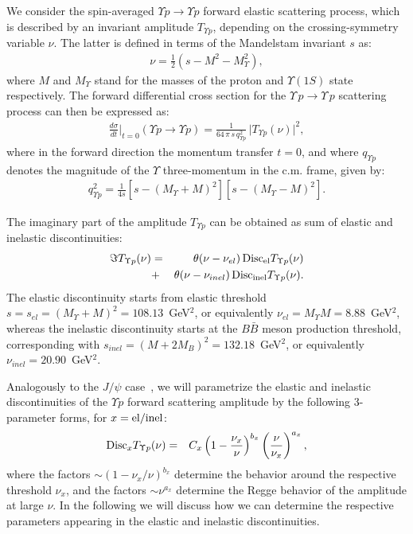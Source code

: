 \documentclass[prd,amsmath,%
twocolumn,floatfix,amssymb, preprintnumbers, linenumbers,nofootinbib, superscriptaddress]{revtex4}
\newcommand{\bea}{\begin{eqnarray}}
\newcommand{\eea}{\end{eqnarray}}
\begin{document}
We consider the spin-averaged $\Upsilon p \to \Upsilon p$ forward elastic scattering process, which is described by an invariant amplitude $T_{\Upsilon p}$, depending on the crossing-symmetry variable $\nu$. The latter is defined in terms of the Mandelstam invariant $s$ as:
\bea
\nu = \frac{1}{2} (s - M^2 - M_\Upsilon^2),
\eea
where $M$ and $M_\Upsilon$ stand for the masses of the proton and $\Upsilon(1S)$ state respectively.  
The forward differential cross section for the $\Upsilon \, p \to \Upsilon \, p$ scattering process can then be expressed as:
\bea
\frac{d \sigma}{dt} \biggr|_{t = 0} (\Upsilon p \to \Upsilon p) = \frac{1}{64 \, \pi \, s \, q_{\Upsilon p}^2} \, \big| T_{\Upsilon p}(\nu) \big|^2,
\eea
where in the forward direction the momentum transfer $t = 0$, and where $q_{\Upsilon p}$ denotes the magnitude of the $\Upsilon$ three-momentum in the c.m. frame, given by:
 \bea 
 q_{\Upsilon p}^2  = \frac{1}{4 s} \left[ s - (M_\Upsilon + M)^2 \right] \left[ s - (M_\Upsilon - M)^2 \right].
 \eea 
 
The imaginary part of the amplitude $T_{\Upsilon p}$ can be obtained as sum of elastic and inelastic discontinuities:
\bea
\Im T_{\Upsilon p}(\nu)  &=& \theta(\nu - \nu_{el}) \,  {\rm Disc}_{\rm el} T_{\Upsilon p}(\nu) \nonumber \\
&+&   \theta(\nu - \nu_{inel}) \,  {\rm Disc}_{\rm inel} T_{\Upsilon p}(\nu).
\label{eq:disctot}
\eea
The elastic discontinuity starts from elastic threshold $s = s_{el} = (M_\Upsilon + M)^2 = 108.13$~GeV$^2$, or equivalently $\nu_{el} = M_\Upsilon M = 8.88$~GeV$^2$, whereas the inelastic discontinuity starts at the $B \bar B$ meson production threshold, corresponding with $s_{inel} = (M + 2 M_B)^2 = 132.18$~GeV$^2$, or equivalently $\nu_{inel} = 20.90$~GeV$^2$. 

Analogously to the $J/\psi$ case~\cite{Gryniuk:2016mpk}, we will parametrize the elastic and inelastic discontinuities of the $\Upsilon p$  forward scattering amplitude by the following 3-parameter forms, for $x = {\rm el/inel}$:
\bea
{\rm Disc}_{x} T_{\Upsilon p}(\nu)  &=& 
C_{x} \left( 1 - \frac{\nu_{x}}{\nu} \right)^{b_{x}}  \left( \frac{\nu}{\nu_{x}} \right)^{a_{x}} ,
\label{eq:discx} 
\eea
where the factors $\sim (1 - \nu_x / \nu)^{b_x}$  
determine the behavior around the respective threshold $\nu_x$, and the 
factors  $\sim \nu^{a_x}$ determine the Regge behavior of the amplitude at large $\nu$. 
In the following we will discuss how we can determine the respective parameters 
appearing in the elastic and inelastic discontinuities. 
\end{document}
